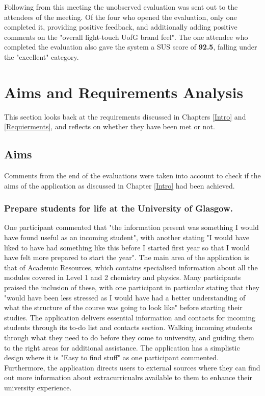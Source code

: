 \documentclass{l4proj}
\begin{document}
Following from this meeting the unobserved evaluation was sent out to the attendees of the meeting. Of the four who opened the evaluation,  only one completed it,  providing positive feedback,  and additionally adding positive comments on the "overall light-touch UofG brand feel". The one attendee who completed the evaluation also gave the system a SUS score of \textbf{92.5},  falling under the "excellent" category.

\section{Aims and Requirements Analysis}
This section looks back at the requirements discussed in Chapters \ref{Intro} and \ref{Requierments},  and reflects on whether they have been met or not.

\subsection{Aims}
Comments from the end of the evaluations were taken into account to check if the aims of the application as discussed in Chapter \ref{Intro} had been achieved.

\subsubsection{Prepare students for life at the University of Glasgow.}
One participant commented that "the information present was something I would have found useful as an incoming student",  with another stating "I would have liked to have had something like this before I started first year so that I would have felt more prepared to start the year". The main area of the application is that of Academic Resources,  which contains specialised information about all the modules covered in Level 1 and 2 chemistry and physics. Many participants praised the inclusion of these,  with one participant in particular stating that they "would have been less stressed as I would have had a better understanding of what the structure of the course was going to look like" before starting their studies. The application delivers essential information and contacts for incoming students through its to-do list and contacts section. Walking incoming students through what they need to do before they come to university,  and guiding them to the right areas for additional assistance. The application has a simplistic design where it is "Easy to find stuff" as one participant commented. Furthermore,  the application directs users to external sources where they can find out more information about extracurricualrs available to them to enhance their university experience.
\end{document}
